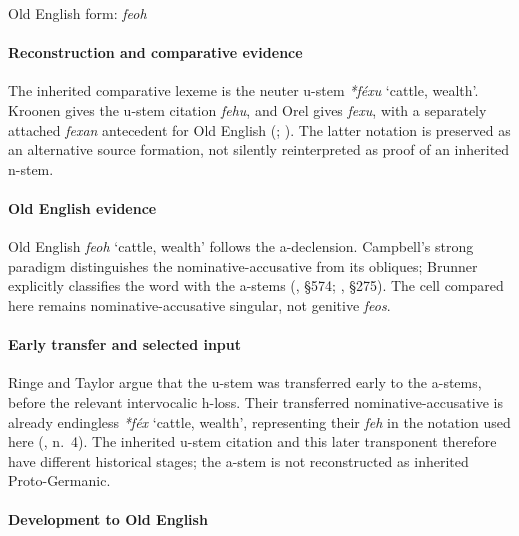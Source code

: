 \documentclass[
  british,
  a4paper,
]{article}
\providecommand{\Recon}[1]{\emph{*#1}}
\begin{document}
Old English form: \emph{feoh}

\paragraph{Reconstruction and comparative
evidence}\label{reconstruction-and-comparative-evidence-96}

The inherited comparative lexeme is the neuter u-stem \Recon{féxu}
`cattle, wealth'. Kroonen gives the u-stem citation \emph{fehu}, and
Orel gives \emph{fexu}, with a separately attached \emph{fexan}
antecedent for Old English (; ). The latter notation is
preserved as an alternative source formation, not silently reinterpreted
as proof of an inherited n-stem.

\paragraph{Old English evidence}\label{old-english-evidence-98}

Old English {\emph{feoh}} `cattle, wealth' follows the a-declension.
Campbell's strong paradigm distinguishes the nominative-accusative from
its obliques; Brunner explicitly classifies the word with the a-stems
(, §574;
, §275). The cell
compared here remains nominative-accusative singular, not genitive
\emph{feos}.

\paragraph{Early transfer and selected
input}\label{early-transfer-and-selected-input}

Ringe and Taylor argue that the u-stem was transferred early to the
a-stems, before the relevant intervocalic h-loss. Their transferred
nominative-accusative is already endingless \Recon{féx} `cattle,
wealth', representing their \emph{feh} in the notation used here
(, n.~4). The
inherited u-stem citation and this later transponent therefore have
different historical stages; the a-stem is not reconstructed as
inherited Proto-Germanic.

\paragraph{Development to Old
English}\label{development-to-old-english-96}
\end{document}
